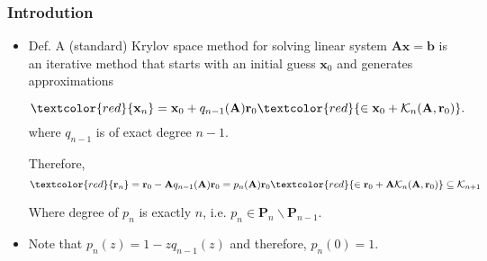 \documentclass[mathserif]{beamer}
\begin{document}
\begin{frame}
 \frametitle{Introdution}
\begin{itemize}[<+->]

\item Def. A (standard) Krylov space method for solving linear system $\mathbf{A}\mathbf{x}=\mathbf{b}$ is an iterative method that starts with an initial guess $\mathbf{x}_0$ and generates approximations 

\[\textcolor{red}{\mathbf{x}_n} = \mathbf{x}_0+ q_{n-1}(\mathbf{A})\mathbf{r}_0 \textcolor{red}{ \in \mathbf{x}_0+ \mathcal{K}_n(\mathbf{A},\mathbf{r}_0)}.\] where $q_{n-1}$ is of exact degree $n-1$. 

\pause
Therefore, \[\textcolor{red}{\mathbf{r}_n} =\mathbf{r}_0-\mathbf{A}q_{n-1}(\mathbf{A})\mathbf{r}_0 =p_n(\mathbf{A})\mathbf{r}_0 \textcolor{red}{ \in  \mathbf{r}_0 +
 \mathbf{A}\mathcal{K}_n(\mathbf{A},\mathbf{r}_0)}\subseteq\mathcal{K}_{n+1}\] 

Where degree of $p_n$ is exactly $n$, i.e. $p_n \in \mathbf{P}_n \backslash \mathbf{P}_{n-1}$.

\item Note that $p_n(z)=1-zq_{n-1}(z)$ and therefore, $p_n(0)=1.$

\end{itemize}
\end{frame}
\end{document}
